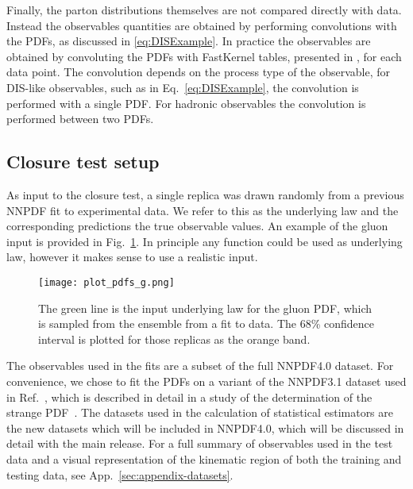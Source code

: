 Finally, the parton distributions themselves are not compared directly with
data. Instead the observables quantities are obtained by performing convolutions
with the PDFs, as discussed in \ref{eq:DISExample}. In practice the observables
are obtained by convoluting the PDFs with FastKernel tables, presented in
\cite{Ball_2010,Bertone_2017}, for each data point. The convolution depends on
the process type of the observable, for DIS-like observables, such as in
Eq.~\ref{eq:DISExample}, the convolution is performed with a single PDF. For
hadronic observables the convolution is performed between two PDFs.

\subsection{Closure test setup}

As input to the closure test, a single replica was drawn randomly from a
previous NNPDF fit to experimental data. We refer to this as the underlying law
and the corresponding predictions the true observable values. An example of the
gluon input is provided in Fig.~\ref{fig:InputGluonPDF}. In principle any
function could be used as underlying law, however it makes sense to use a
realistic input.

\begin{figure}
    \centering
    \texttt{[image: plot\_pdfs\_g.png]}
    \caption{The green line is the input underlying law for the gluon PDF,
    which is sampled from the ensemble from a fit to data. The 68\% confidence
    interval is plotted for those replicas as the orange band.}
    \label{fig:InputGluonPDF}
\end{figure}

The observables used in the fits are a subset of the full NNPDF4.0 dataset. For
convenience, we chose to fit the PDFs on a variant of the NNPDF3.1 dataset used
in Ref.~\cite{Ball_2018}, which is described in detail in a study of the
determination of the strange PDF~\cite{Faura_2020}. The datasets used in the
calculation of statistical estimators are the new datasets which will be
included in NNPDF4.0, which will be discussed in detail with the main release.
For a full summary of observables used in the test data and a visual
representation of the kinematic region of both the training and testing data,
see App.~\ref{sec:appendix-datasets}.

